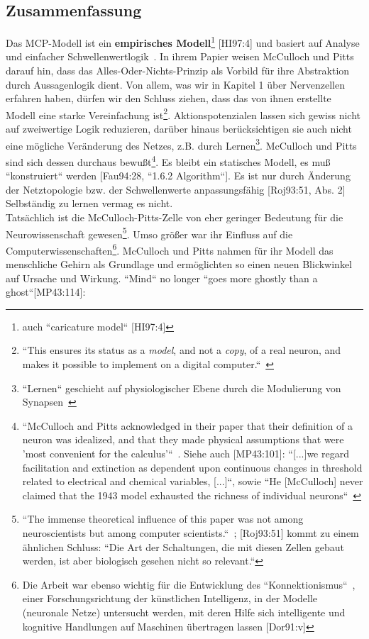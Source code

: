 {\clearpage
\pagebreak


\subsection{Zusammenfassung}\label{mcp-summary}

Das MCP-Modell ist ein \textbf{empirisches Modell}\footnote{
    auch ``caricature model`` [HI97:4]
} [HI97:4] und basiert auf Analyse und einfacher Schwellenwertlogik~\cite[16]{AR88}.
In ihrem Papier weisen McCulloch und Pitts darauf hin, dass das Alles-Oder-Nichts-Prinzip als Vorbild für ihre Abstraktion durch Aussagenlogik dient.
Von allem, was wir in Kapitel 1 über Nervenzellen erfahren haben, dürfen wir den Schluss ziehen, dass das von ihnen erstellte Modell eine starke Vereinfachung ist\footnote{
    ``This ensures its status as a \textit{model}, and not a \textit{copy}, of a real neuron, and makes it possible to implement on a digital computer.``~\cite[43, Hervorhebungen i. O.]{BJ90}
}.
Aktionspotenzialen lassen sich gewiss nicht auf zweiwertige Logik reduzieren, darüber hinaus berücksichtigen sie auch nicht eine mögliche Veränderung des Netzes, z.B. durch Lernen\footnote{
    ``Lernen`` geschieht auf physiologischer Ebene durch die Modulierung von Synapsen~\cite[115]{HS19c}
}.
McCulloch und Pitts sind sich dessen durchaus bewußt\footnote{
    ``McCulloch and Pitts acknowledged in their paper that their definition of a neuron was idealized, and that they made physical assumptions that were 'most convenient for the calculus'``~\cite[21]{Abr02}. Siehe auch [MP43:101]: ``[...]we regard facilitation and extinction as dependent upon continuous changes in threshold related to electrical and chemical variables, [...]``, sowie ``He {[McCulloch]} never claimed that the 1943 model exhausted the richness of individual neurons``~\cite[11]{Arb19}
}.
Es bleibt ein statisches Modell, es muß ``konstruiert`` werden [Fau94:28, ``1.6.2 Algorithm``].
Es ist nur durch Änderung der Netztopologie bzw. der Schwellenwerte anpassungsfähig [Roj93:51, Abs. 2] Selbständig zu lernen vermag es nicht.\\


Tatsächlich ist die McCulloch-Pitts-Zelle von eher geringer Bedeutung für die Neurowissenschaft gewesen\footnote{
    ``The immense theoretical influence of this paper was not among neuroscientists but among computer scientists.``~\cite[17]{AR88}; [Roj93:51] kommt zu einem ähnlichen Schluss: ``Die Art der Schaltungen, die mit
    diesen Zellen gebaut werden, ist aber biologisch gesehen nicht so relevant.``
}.
Umso größer war ihr Einfluss auf die Computerwissenschaften\footnote{
    Die Arbeit war ebenso wichtig für die Entwicklung des ``Konnektionismus``~\cite[11]{Arb19}, einer Forschungsrichtung der künstlichen Intelligenz, in der Modelle (neuronale Netze) untersucht werden, mit deren Hilfe sich intelligente und kognitive Handlungen auf Maschinen übertragen lassen [Dor91:v]
}.
McCulloch und Pitts nahmen für ihr Modell das menschliche Gehirn als Grundlage und ermöglichten so einen neuen Blickwinkel auf Ursache und Wirkung. ``Mind`` no longer ``goes more ghostly than a ghost``[MP43:114]:

}
